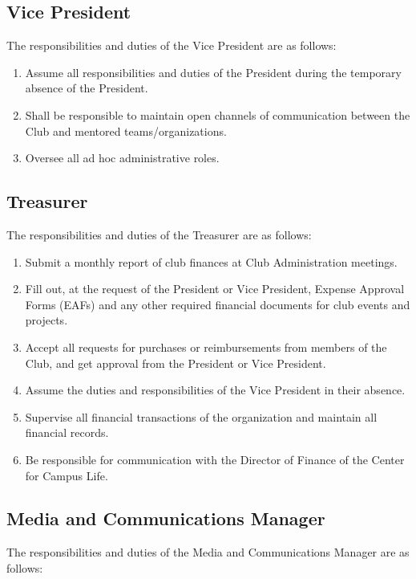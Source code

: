 \documentclass[english,11pt]{article}
\begin{document}
\subsection{Vice President} \label{sect:cadmin:vicepresident}
The responsibilities and duties of the Vice President are as follows:

\begin{enumerate}[label=\Alph*.]	
    \item Assume all responsibilities and duties of the President during the temporary absence of the President.
    \item Shall be responsible to maintain open channels of communication between the Club and mentored teams/organizations.
    \item Oversee all ad hoc administrative roles.
\end{enumerate}

\subsection{Treasurer} \label{sect:cadmin:treasurer}
The responsibilities and duties of the Treasurer are as follows:

\begin{enumerate}[label=\Alph*.]
    \item Submit a monthly report of club finances at Club Administration meetings.
    \item Fill out, at the request of the President or Vice President, Expense Approval Forms (EAFs) and any other required financial documents for club events and projects.
    \item Accept all requests for purchases or reimbursements from members of the Club, and get approval from the President or Vice President.
    \item Assume the duties and responsibilities of the Vice President in their absence.
    \item Supervise all financial transactions of the organization and maintain all financial records.
    \item Be responsible for communication with the Director of Finance of the Center for Campus Life.
\end{enumerate}

\subsection{Media and Communications Manager} \label{sect:cadmin:mediacomms}
The responsibilities and duties of the Media and Communications Manager are as follows:
\end{document}
